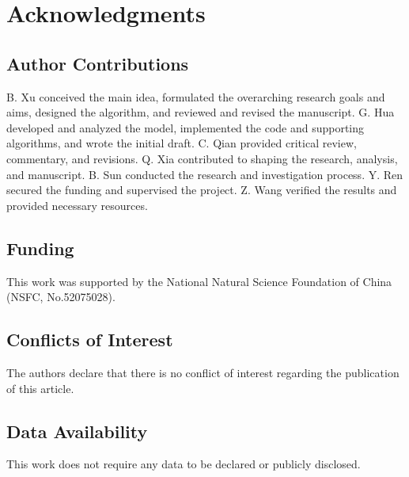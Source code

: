 \documentclass{article}
\begin{document}
\section*{Acknowledgments}

\subsection*{Author Contributions} 

B. Xu conceived the main idea, formulated the overarching research goals and aims, designed the algorithm, and reviewed and revised the manuscript.
G. Hua developed and analyzed the model, implemented the code and supporting algorithms, and wrote the initial draft.
C. Qian provided critical review, commentary, and revisions.
Q. Xia contributed to shaping the research, analysis, and manuscript.
B. Sun conducted the research and investigation process.
Y. Ren secured the funding and supervised the project.
Z. Wang verified the results and provided necessary resources.

\subsection*{Funding}

This work was supported by the National Natural Science Foundation of China (NSFC, No.52075028).

\subsection*{Conflicts of Interest}

The authors declare that there is no conflict of interest regarding the publication of this article.

\subsection*{Data Availability}

This work does not require any data to be declared or publicly disclosed.
\end{document}
